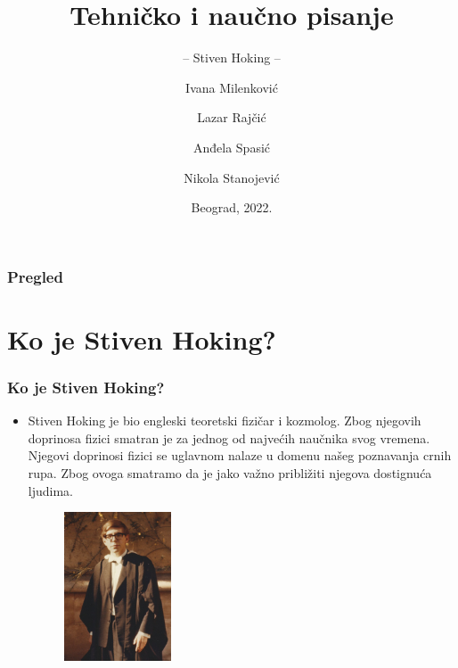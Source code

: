 \documentclass{beamer}
\title{Tehničko i naučno pisanje}
\subtitle{-- Stiven Hoking --}
\author{ Ivana Milenković\\ \and Lazar Rajčić\\ \and Anđela Spasić\\ \and Nikola Stanojević }
\institute{Matematički fakultet\\Univerzitet u Beogradu}
\date{
	\footnotesize{Beograd, 2022.}	
}
\begin{document}
\begin{frame}
	\thispagestyle{empty}
	\titlepage
\end{frame}

\addtocounter{framenumber}{-1}

\begin{frame} \fontsize{9}{6}\selectfont
	\frametitle{Pregled}
	\tableofcontents[hidesubsections] 
\end{frame}
\section{Ko je Stiven Hoking?}

\begin{frame}[fragile]\frametitle{Ko je Stiven Hoking?}
	\begin{itemize} \fontsize{9}{6}\selectfont	
		\item  Stiven Hoking je bio engleski teoretski fizičar i kozmolog. Zbog njegovih doprinosa fizici smatran je za jednog od najvećih naučnika svog vremena. Njegovi doprinosi fizici se uglavnom nalaze u domenu našeg poznavanja crnih rupa. Zbog ovoga smatramo da je jako važno približiti njegova dostignuća ljudima.
\begin{figure}[h!]
  \centering
  \includegraphics[width=0.3\textwidth]{Hoking,PreDijagnoze.jpg}
  \captionsetup{font=small}{Slika1: Hoking, na dodeli diploma 1960.}
  \label{fig:Hoking,PreDijagnoze}
  \end{figure}
	\end{itemize}
\end{frame}
\end{document}
